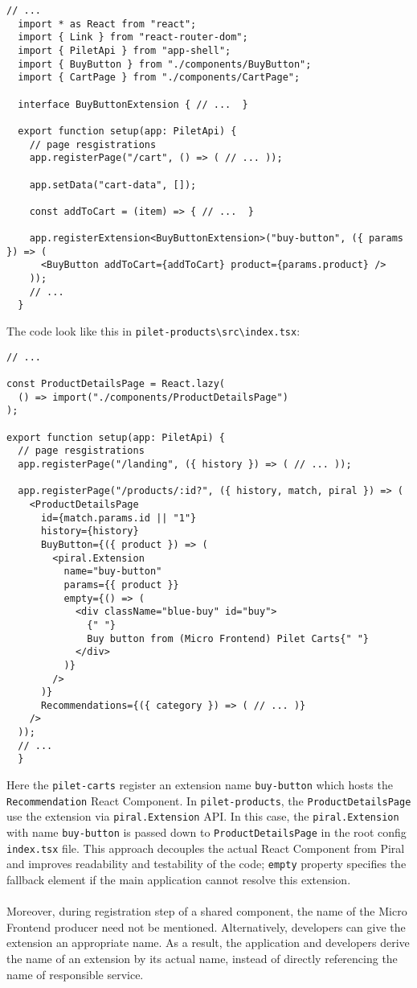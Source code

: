 \documentclass[a4paper]{book}
\begin{document}
\begin{lstlisting}[caption={pilet-carts extension}]
  // ...
  import * as React from "react";
  import { Link } from "react-router-dom";
  import { PiletApi } from "app-shell";
  import { BuyButton } from "./components/BuyButton";
  import { CartPage } from "./components/CartPage";
  
  interface BuyButtonExtension { // ...  }
  
  export function setup(app: PiletApi) {
    // page resgistrations
    app.registerPage("/cart", () => ( // ... ));
    
    app.setData("cart-data", []);
  
    const addToCart = (item) => { // ...  }
  
    app.registerExtension<BuyButtonExtension>("buy-button", ({ params }) => (
      <BuyButton addToCart={addToCart} product={params.product} />
    ));
    // ...
  }
\end{lstlisting}

The code look like this in \verb|pilet-products\src\index.tsx|:

\begin{lstlisting}[caption={pilet-products uses pilet-carts extension}]
  // ...

const ProductDetailsPage = React.lazy(
  () => import("./components/ProductDetailsPage")
);

export function setup(app: PiletApi) {
  // page resgistrations
  app.registerPage("/landing", ({ history }) => ( // ... ));

  app.registerPage("/products/:id?", ({ history, match, piral }) => (
    <ProductDetailsPage
      id={match.params.id || "1"}
      history={history}
      BuyButton={({ product }) => (
        <piral.Extension
          name="buy-button"
          params={{ product }}
          empty={() => (
            <div className="blue-buy" id="buy">
              {" "}
              Buy button from (Micro Frontend) Pilet Carts{" "}
            </div>
          )}
        />
      )}
      Recommendations={({ category }) => ( // ... )}
    />
  ));
  // ...
  }
\end{lstlisting}

Here the \verb|pilet-carts| register an extension name \verb|buy-button| which hosts the \verb|Recommendation| React Component. In \verb|pilet-products|, the \verb|ProductDetailsPage| use the extension via \verb|piral.Extension| API. In this case, the \verb|piral.Extension| with name \verb|buy-button| is passed down to \verb|ProductDetailsPage| in the root config \verb|index.tsx| file. This approach decouples the actual React Component from Piral and improves readability and testability of the code; \verb|empty| property specifies the fallback element if the main application cannot resolve this extension.
\\ \\ 
Moreover, during registration step of a shared component, the name of the Micro Frontend producer need not be mentioned. Alternatively, developers can give the extension an appropriate name. As a result, the application and developers derive the name of an extension by its actual name, instead of directly referencing the name of responsible service.
\end{document}
